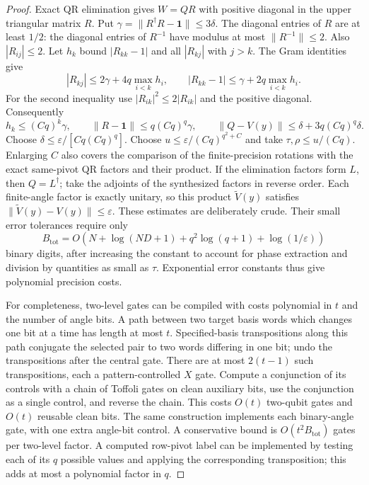 \documentclass[11pt]{article}
\newcommand{\id}{\mathbf 1}
\begin{document}
\begin{proof}
Exact QR elimination gives $W=QR$ with positive diagonal in the
upper triangular matrix $R$. Put
$\gamma=\|R^\dagger R-\id\|\leq3\delta$.
The diagonal entries of $R$ are at least $1/2$: the diagonal entries
of $R^{-1}$ have modulus at most $\|R^{-1}\|\leq2$.
Also $|R_{ij}|\leq2$. Let $h_k$ bound $|R_{kk}-1|$ and all
$|R_{kj}|$ with $j>k$. The Gram identities give
\[
 |R_{kj}|\leq2\gamma+4q\max_{i<k}h_i,
 \qquad
 |R_{kk}-1|\leq\gamma+2q\max_{i<k}h_i.
\]
For the second inequality use
$|R_{ik}|^2\leq2|R_{ik}|$ and the positive diagonal.
Consequently
\[
 h_k\leq(Cq)^k\gamma,
 \qquad \|R-\id\|\leq q(Cq)^q\gamma,
 \qquad
 \|Q-V(y)\|\leq \delta+3q(Cq)^q\delta.
\]
Choose $\delta\leq\varepsilon/[Cq(Cq)^q]$.
Choose $u\leq\varepsilon/(Cq)^{q^2+C}$ and take
$\tau,\rho\leq u/(Cq)$. Enlarging $C$ also covers the comparison
of the finite-precision rotations with the exact same-pivot QR
factors and their product. If the elimination factors form $L$,
then $Q=L^\dagger$; take the adjoints of the synthesized factors
in reverse order. Each finite-angle factor is exactly unitary,
so this product $\widetilde V(y)$ satisfies
$\|\widetilde V(y)-V(y)\|\leq\varepsilon$.
These estimates are deliberately crude. Their small error tolerances
require only
\[
 B_{\mathrm{tot}}=
 O\!\left(N+\log(ND+1)+q^2\log(q+1)+\log(1/\varepsilon)\right)
\]
binary digits, after increasing the constant to account for phase
extraction and division by quantities as small as $\tau$.
Exponential error constants thus give polynomial precision costs.

For completeness, two-level gates can be compiled with costs
polynomial in $t$ and the number of angle bits. A path between two
target basis words which changes one bit at a time has length at
most $t$. Specified-basis transpositions along this path conjugate
the selected pair to two words differing in one bit; undo the
transpositions after the central gate. There are at most
$2(t-1)$ such transpositions, each a pattern-controlled $X$ gate.
Compute a conjunction of its controls with a chain of Toffoli
gates on clean auxiliary bits, use the conjunction as a single
control, and reverse the chain. This costs $O(t)$ two-qubit gates
and $O(t)$ reusable clean bits. The same construction implements
each binary-angle gate, with one extra angle-bit control. A
conservative bound is $O(t^2B_{\mathrm{tot}})$ gates per two-level
factor. A computed row-pivot label can be implemented by testing
each of its $q$ possible values and applying the corresponding
transposition; this adds at most a polynomial factor in $q$.


\end{proof}
\end{document}
